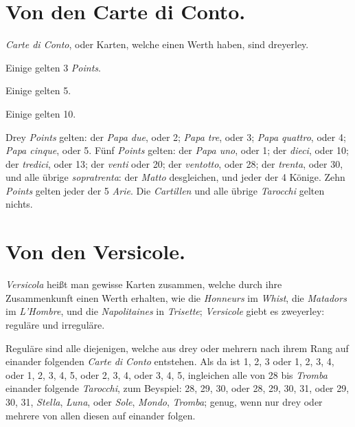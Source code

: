 \documentclass[11pt,a6paper,twoside]{article}
\begin{document}
\section{Von den Carte di Conto.}

\textit{Carte di Conto}, oder Karten, welche einen Werth haben, sind dreyerley.

Einige gelten 3 \textit{Points}.

Einige gelten 5.

Einige gelten 10.

Drey \textit{Points} gelten: der \textit{Papa due}, oder 2; \textit{Papa tre}, oder 3; \textit{Papa quattro}, oder 4; \textit{Papa cinque}, oder 5. Fünf \textit{Points} gelten: der \textit{Papa uno}, oder 1; der \textit{dieci}, oder 10; der \textit{tredici}, oder 13; der \textit{venti} oder 20; der \textit{ventotto}, oder 28; der \textit{trenta}, oder 30, und alle übrige \textit{sopratrenta}: der \textit{Matto} desgleichen, und jeder der 4 Könige. Zehn \textit{Points} gelten jeder der 5 \textit{Arie}. Die \textit{Cartillen} und alle übrige \textit{Tarocchi} gelten nichts.


\section{Von den Versicole.}

\textit{Versicola} heißt man gewisse Karten zusammen, welche durch ihre Zusammenkunft einen Werth erhalten, wie die \textit{Honneurs} im \textit{Whist}, die \textit{Matadors} im \textit{L'Hombre}, und die \textit{Napolitaines} in \textit{Trisette}; \textit{Versicole} giebt es zweyerley: reguläre und irreguläre.

Reguläre sind alle diejenigen, welche aus drey oder mehrern nach ihrem Rang auf einander folgenden \textit{Carte di Conto} entstehen. Als da ist 1, 2, 3 oder 1, 2, 3, 4, oder 1, 2, 3, 4, 5, oder 2, 3, 4, oder 3, 4, 5, ingleichen alle von 28 bis \textit{Tromba} einander folgende \textit{Tarocchi}, zum Beyspiel: 28, 29, 30, oder 28, 29, 30, 31, oder 29, 30, 31, \textit{Stella}, \textit{Luna}, oder \textit{Sole}, \textit{Mondo}, \textit{Tromba}; genug, wenn nur drey oder mehrere von allen diesen auf einander folgen.
\end{document}
